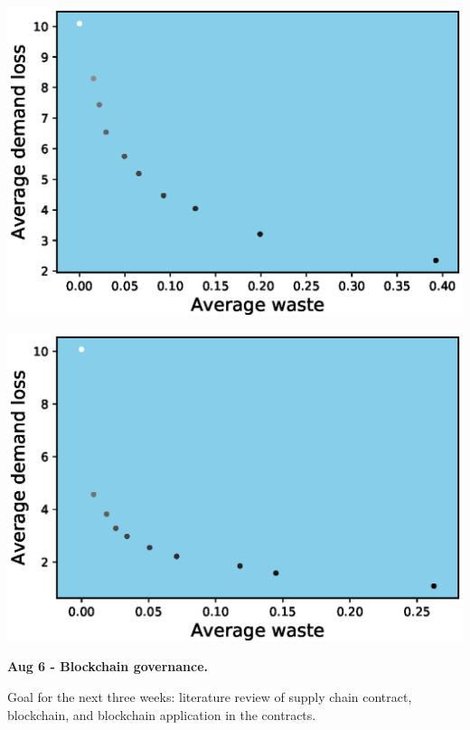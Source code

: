 \documentclass{article}
\newcommand{\pa}[1]{\noindent\textbf{\textsf{#1}}}
\begin{document}
\begin{minipage}[c]{0.5\linewidth}
\includegraphics[width=\linewidth, trim=15 15 15 15, clip]{figures/demandLoss_vs_waste_decentralized.eps}
\end{minipage}
\begin{minipage}[c]{0.5\linewidth}
\includegraphics[width=\linewidth, trim=15 15 15 15, clip]{figures/demandLoss_vs_waste_centralized.eps}
\end{minipage}
\newline
\newline

\pa{Aug 6 - Blockchain governance.}
\newline

Goal for the next three weeks: literature review of supply chain contract, blockchain, and blockchain application in the contracts.
\end{document}
